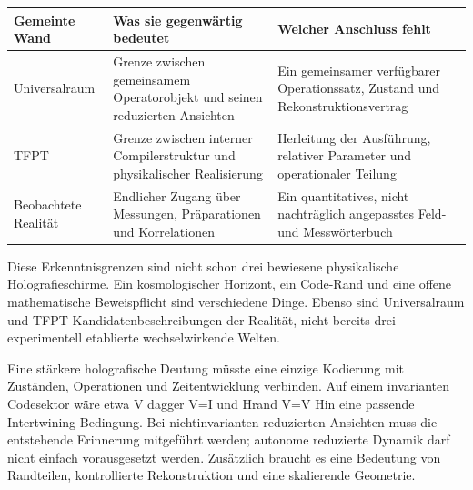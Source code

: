 {\def\LTcaptype{none} %
\begin{longtable}[]{@{}
  >{\raggedright\arraybackslash}p{}
  >{\raggedright\arraybackslash}p{}
  >{\raggedright\arraybackslash}p{}@{}}
\toprule\noalign{}
\begin{minipage}[b]{\linewidth}\raggedright
Gemeinte Wand
\end{minipage} & \begin{minipage}[b]{\linewidth}\raggedright
Was sie gegenwärtig bedeutet
\end{minipage} & \begin{minipage}[b]{\linewidth}\raggedright
Welcher Anschluss fehlt
\end{minipage} \\
\midrule\noalign{}
\endhead
\bottomrule\noalign{}
\endlastfoot
Universalraum & Grenze zwischen gemeinsamem Operatorobjekt und seinen
reduzierten Ansichten & Ein gemeinsamer verfügbarer Operationssatz,
Zustand und Rekonstruktionsvertrag \\
TFPT & Grenze zwischen interner Compilerstruktur und physikalischer
Realisierung & Herleitung der Ausführung, relativer Parameter und
operationaler Teilung \\
Beobachtete Realität & Endlicher Zugang über Messungen, Präparationen
und Korrelationen & Ein quantitatives, nicht nachträglich angepasstes
Feld- und Messwörterbuch \\
\end{longtable}
}

Diese Erkenntnisgrenzen sind nicht schon drei bewiesene physikalische
Holografieschirme. Ein kosmologischer Horizont, ein Code-Rand und eine
offene mathematische Beweispflicht sind verschiedene Dinge. Ebenso sind
Universalraum und TFPT Kandidatenbeschreibungen der Realität, nicht
bereits drei experimentell etablierte wechselwirkende Welten.

Eine stärkere holografische Deutung müsste eine einzige Kodierung mit
Zuständen, Operationen und Zeitentwicklung verbinden. Auf einem
invarianten Codesektor wäre etwa V dagger V=I und Hrand V=V Hin eine
passende Intertwining-Bedingung. Bei nichtinvarianten reduzierten
Ansichten muss die entstehende Erinnerung mitgeführt werden; autonome
reduzierte Dynamik darf nicht einfach vorausgesetzt werden. Zusätzlich
braucht es eine Bedeutung von Randteilen, kontrollierte Rekonstruktion
und eine skalierende Geometrie.

